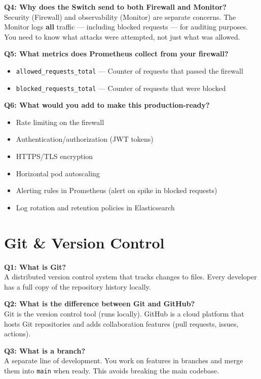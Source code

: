 \documentclass[12pt,a4paper]{article}
\begin{document}
\textbf{Q4: Why does the Switch send to both Firewall and Monitor?}\\
Security (Firewall) and observability (Monitor) are separate concerns. The Monitor logs \textbf{all} traffic --- including blocked requests --- for auditing purposes. You need to know what attacks were attempted, not just what was allowed.

\textbf{Q5: What metrics does Prometheus collect from your firewall?}
\begin{itemize}[noitemsep]
    \item \texttt{allowed\_requests\_total} --- Counter of requests that passed the firewall
    \item \texttt{blocked\_requests\_total} --- Counter of requests that were blocked
\end{itemize}

\textbf{Q6: What would you add to make this production-ready?}
\begin{itemize}[noitemsep]
    \item Rate limiting on the firewall
    \item Authentication/authorization (JWT tokens)
    \item HTTPS/TLS encryption
    \item Horizontal pod autoscaling
    \item Alerting rules in Prometheus (alert on spike in blocked requests)
    \item Log rotation and retention policies in Elasticsearch
\end{itemize}

\section{Git \& Version Control}

\textbf{Q1: What is Git?}\\
A distributed version control system that tracks changes to files. Every developer has a full copy of the repository history locally.

\textbf{Q2: What is the difference between Git and GitHub?}\\
Git is the version control tool (runs locally). GitHub is a cloud platform that hosts Git repositories and adds collaboration features (pull requests, issues, actions).

\textbf{Q3: What is a branch?}\\
A separate line of development. You work on features in branches and merge them into \texttt{main} when ready. This avoids breaking the main codebase.
\end{document}
